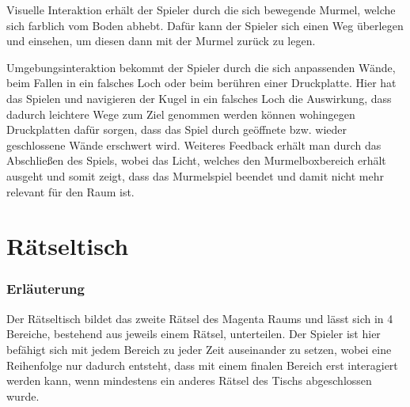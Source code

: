 \noindent Visuelle Interaktion erhält der Spieler durch die sich bewegende Murmel, welche sich farblich vom Boden abhebt. Dafür kann der Spieler sich einen Weg überlegen und einsehen, um diesen dann mit der Murmel zurück zu legen.

\noindent Umgebungsinteraktion bekommt der Spieler durch die sich anpassenden Wände, beim Fallen in ein falsches Loch oder beim berühren einer Druckplatte. Hier hat das Spielen und navigieren der Kugel in ein falsches Loch die Auswirkung, dass dadurch leichtere Wege zum Ziel genommen werden können wohingegen Druckplatten dafür sorgen, dass das Spiel durch geöffnete bzw. wieder geschlossene Wände erschwert wird. Weiteres Feedback erhält man durch das Abschließen des Spiels, wobei das Licht, welches den Murmelboxbereich erhält ausgeht und somit zeigt, dass das Murmelspiel beendet und damit nicht mehr relevant für den Raum ist.\\
\newpage


\section{Rätseltisch}
\subsubsection{Erläuterung}
Der Rätseltisch bildet das zweite Rätsel des Magenta Raums und lässt sich in 4 Bereiche, bestehend aus jeweils einem Rätsel, unterteilen. Der Spieler ist hier befähigt sich mit jedem Bereich zu jeder Zeit auseinander zu setzen, wobei eine Reihenfolge nur dadurch entsteht, dass mit einem finalen Bereich erst interagiert werden kann, wenn mindestens ein anderes Rätsel des Tischs abgeschlossen wurde.

